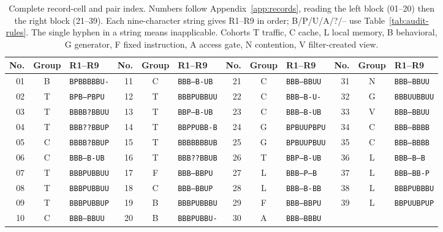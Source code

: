 \begin{table}[t]\centering\footnotesize
\caption{Complete record-cell and pair index. Numbers follow Appendix~\ref{app:records}, reading the left block (01--20) then the right block (21--39). Each nine-character string gives R1--R9 in order; B/P/U/A/?/-- use Table~\ref{tab:audit-rules}. The single hyphen in a string means inapplicable. Cohorts T traffic, C cache, L local memory, B behavioral, G generator, F fixed instruction, A access gate, N contention, V filter-created view.}\label{tab:r37-reconstruction}
\begin{tabular}{@{}rcl@{\hspace{12pt}}rcl@{\hspace{12pt}}rcl@{\hspace{12pt}}rcl@{}}\toprule
No. & Group & R1--R9 & No. & Group & R1--R9 & No. & Group & R1--R9 & No. & Group & R1--R9\\\midrule
01 & B & \texttt{BPBBBBBU-} & 11 & C & \texttt{BBB--B-UB} & 21 & C & \texttt{BBB--BBUU} & 31 & N & \texttt{BBB--BBUU}\\
02 & T & \texttt{BPB--PBPU} & 12 & T & \texttt{BBBPUBBUU} & 22 & C & \texttt{BBB--B-U-} & 32 & G & \texttt{BBBUUBBUU}\\
03 & T & \texttt{BBBB?BBUU} & 13 & T & \texttt{BBP--B-UB} & 23 & C & \texttt{BBB--B-UB} & 33 & V & \texttt{BBB--BBUU}\\
04 & T & \texttt{BBB??BBUP} & 14 & T & \texttt{BBPPUBB-B} & 24 & G & \texttt{BPBUUPBPU} & 34 & C & \texttt{BBB--BBBB}\\
05 & C & \texttt{BBBB?BBUP} & 15 & T & \texttt{BBBBBBBUB} & 25 & G & \texttt{BPBUUPBUU} & 35 & C & \texttt{BBB--BBBB}\\
06 & C & \texttt{BBB--B-UB} & 16 & T & \texttt{BBB??BBUB} & 26 & T & \texttt{BBP--B-UB} & 36 & L & \texttt{BBB--B--B}\\
07 & T & \texttt{BBBPUBBUU} & 17 & F & \texttt{BBB--BBPU} & 27 & L & \texttt{BBB--P--B} & 37 & L & \texttt{BBB--BB-P}\\
08 & T & \texttt{BBBPUBBUU} & 18 & C & \texttt{BBB--BBUP} & 28 & L & \texttt{BBB--B-BB} & 38 & L & \texttt{BBBPUBBBU}\\
09 & T & \texttt{BBBPUBBUP} & 19 & B & \texttt{BBBPUBBBU} & 29 & F & \texttt{BBB--BBPU} & 39 & L & \texttt{BBPUUBPUP}\\
10 & C & \texttt{BBB--BBUU} & 20 & B & \texttt{BBBPUBBU-} & 30 & A & \texttt{BBB--BBBU} &  & & \\
\bottomrule\end{tabular}

\end{table}
